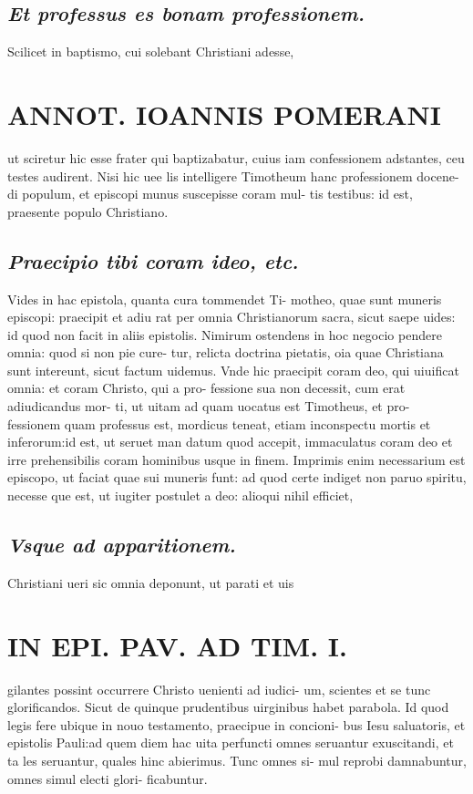\documentclass{article}
\begin{document}
\begin{pages}
\subsection*{\textit{Et professus es bonam professionem. }}\pstart Scilicet in baptismo, cui solebant Christiani adesse,  \pend
\section*{ANNOT. IOANNIS POMERANI }\pstart ut sciretur hic esse frater qui baptizabatur, cuius iam confessionem adstantes, ceu testes audirent. Nisi hic uee lis intelligere Timotheum hanc professionem docene- di populum, et episcopi munus suscepisse coram mul- tis testibus: id est, praesente populo Christiano.  \pend
{}
{}
\subsection*{\textit{Praecipio tibi coram ideo, etc. }}\pstart Vides in hac epistola, quanta cura tommendet Ti- motheo, quae sunt muneris episcopi: praecipit et adiu rat per omnia Christianorum sacra, sicut saepe uides: id quod non facit in aliis epistolis. Nimirum ostendens in hoc negocio pendere omnia: quod si non pie cure- tur, relicta doctrina pietatis, oia quae Christiana sunt intereunt, sicut factum uidemus. Vnde hic praecipit coram deo, qui uiuificat omnia: et coram Christo, qui a pro- fessione sua non decessit, cum erat adiudicandus mor- ti, ut uitam ad quam uocatus est Timotheus, et pro- fessionem quam professus est, mordicus teneat, etiam inconspectu mortis et inferorum:id est, ut seruet man datum quod accepit, immaculatus coram deo et irre prehensibilis coram hominibus usque in finem. Imprimis enim necessarium est episcopo, ut faciat quae sui muneris funt: ad quod certe indiget non paruo spiritu, necesse que est, ut iugiter postulet a deo: alioqui nihil efficiet,  \pend
{}
{}
\subsection*{\textit{Vsque ad apparitionem. }}\pstart Christiani ueri sic omnia deponunt, ut parati et uis  \pend
\section*{IN EPI. PAV. AD TIM. I. }\pstart gilantes possint occurrere Christo uenienti ad iudici- um, scientes et se tunc glorificandos. Sicut de quinque  prudentibus uirginibus habet parabola. Id quod legis fere ubique in nouo testamento, praecipue in concioni- bus Iesu saluatoris, et epistolis Pauli:ad quem diem hac uita perfuncti omnes seruantur exuscitandi, et ta les seruantur, quales hinc abierimus. Tunc omnes si- mul reprobi damnabuntur, omnes simul electi glori- ficabuntur.  \pend
{}
{}

\end{pages}
\end{document}
